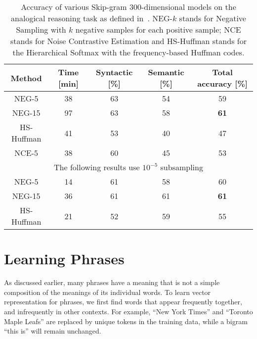 \documentclass{article}
\begin{document}
\begin{table}
\small
  \begin{center}
  \begin{tabular}{|c|c|c c |c|}
    \hline 
    Method & Time [min]  & Syntactic [\%] &  Semantic [\%] & Total accuracy [\%] \\
    \hline
    NEG-5  & 38          & 63        &  54       & 59    \\
    NEG-15 & 97          & 63        &  58       & {\bf 61}    \\
    HS-Huffman & 41      & 53        &  40       & 47    \\
    NCE-5  & 38          & 60        &  45       & 53    \\
    \hline
    \multicolumn{5}{|c|}{The following results use $10^{-5}$ subsampling}   \\
    \hline
    NEG-5  & 14          & 61        & 58        & 60    \\
    NEG-15 & 36          & 61        & 61        & {\bf 61}    \\
    HS-Huffman & 21      & 52        & 59        & 55     \\
    \hline
  \end{tabular}
  \end{center}
  \caption{\label{table:performance_1} Accuracy of
    various Skip-gram 300-dimensional models on the
    analogical reasoning task as defined in~\cite{mikolov}.
    NEG-$k$ stands for Negative Sampling with $k$
    negative samples for each positive sample; NCE stands for Noise Contrastive Estimation and
    HS-Huffman stands for the Hierarchical Softmax with the frequency-based Huffman
    codes.}
\end{table}

\section{Learning Phrases}

As discussed earlier, many phrases have a
meaning that is not a simple composition of the meanings of its individual
words. To learn vector representation for phrases, we first
find words that appear frequently together, and infrequently
in other contexts. For example, ``New York Times'' and
``Toronto Maple Leafs'' are replaced by unique tokens in the training data,
while a bigram ``this is'' will remain unchanged.
\end{document}
